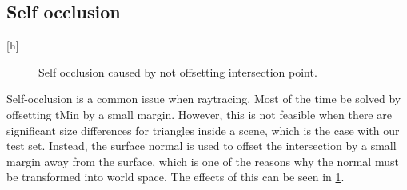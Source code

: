 \subsection{Self occlusion}
\label{sec:SelfOcclusion}[h]
\begin{figure}
    \hfill
    \hfill
    \hfill
    \caption{Self occlusion caused by not offsetting intersection point.}
    \label{fig:SelfOcclusion}
\end{figure}
Self-occlusion is a common issue when raytracing. Most of the time be solved by offsetting tMin by a small margin. However, this is not feasible when there are significant size differences for triangles inside a scene, which is the case with our test set. Instead, the surface normal is used to offset the intersection by a small margin away from the surface, which is one of the reasons why the normal must be transformed into world space. The effects of this can be seen in \ref{fig:SelfOcclusion}.
